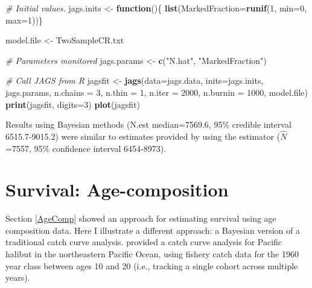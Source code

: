 \documentclass[
]{krantz}
\makeatletter
\newenvironment{Shaded}{\begin{snugshade}}{\end{snugshade}}
\newcommand{\AttributeTok}[1]{\textcolor[rgb]{0.27,0.27,0.27}{#1}}
\newcommand{\CommentTok}[1]{\textcolor[rgb]{0.37,0.37,0.37}{\textit{#1}}}
\newcommand{\ControlFlowTok}[1]{\textcolor[rgb]{0.27,0.27,0.27}{\textbf{#1}}}
\newcommand{\DecValTok}[1]{\textcolor[rgb]{0.06,0.06,0.06}{#1}}
\newcommand{\FunctionTok}[1]{\textcolor[rgb]{0.27,0.27,0.27}{\textbf{#1}}}
\newcommand{\NormalTok}[1]{#1}
\newcommand{\OtherTok}[1]{\textcolor[rgb]{0.37,0.37,0.37}{#1}}
\newcommand{\StringTok}[1]{\textcolor[rgb]{0.5,0.5,0.5}{#1}}
\newenvironment{kframe}{%
\medskip{}
\setlength{\fboxsep}{.8em}
 \def\at@end@of@kframe{}%
 \ifinner\ifhmode%
  \def\at@end@of@kframe{\end{minipage}}%
  \begin{minipage}{\columnwidth}%
 \fi\fi%
 \def\FrameCommand##1{\hskip\@totalleftmargin \hskip-\fboxsep
 \colorbox{shadecolor}{##1}\hskip-\fboxsep
     \hskip-\linewidth \hskip-\@totalleftmargin \hskip\columnwidth}%
 \MakeFramed {\advance\hsize-\width
   \@totalleftmargin\z@ \linewidth\hsize
   \@setminipage}}%
 {\par\unskip\endMakeFramed%
 \at@end@of@kframe}
\renewenvironment{Shaded}{\begin{kframe}}{\end{kframe}}
\makeatother
\begin{document}
\begin{Shaded}
\begin{Highlighting}[]
\CommentTok{\# Initial values.}
\NormalTok{jags.inits }\OtherTok{\textless{}{-}} \ControlFlowTok{function}\NormalTok{()\{ }\FunctionTok{list}\NormalTok{(}\AttributeTok{MarkedFraction=}\FunctionTok{runif}\NormalTok{(}\DecValTok{1}\NormalTok{, }\AttributeTok{min=}\DecValTok{0}\NormalTok{, }\AttributeTok{max=}\DecValTok{1}\NormalTok{))\}}

\NormalTok{model.file }\OtherTok{\textless{}{-}} \StringTok{\textquotesingle{}TwoSampleCR.txt\textquotesingle{}}

\CommentTok{\# Parameters monitored}
\NormalTok{jags.params }\OtherTok{\textless{}{-}} \FunctionTok{c}\NormalTok{(}\StringTok{"N.hat"}\NormalTok{, }\StringTok{"MarkedFraction"}\NormalTok{)}

\CommentTok{\# Call JAGS from R}
\NormalTok{jagsfit }\OtherTok{\textless{}{-}} \FunctionTok{jags}\NormalTok{(}\AttributeTok{data=}\NormalTok{jags.data, }\AttributeTok{inits=}\NormalTok{jags.inits, jags.params,}
                \AttributeTok{n.chains =} \DecValTok{3}\NormalTok{, }\AttributeTok{n.thin =} \DecValTok{1}\NormalTok{, }\AttributeTok{n.iter =} \DecValTok{2000}\NormalTok{,}
                \AttributeTok{n.burnin =} \DecValTok{1000}\NormalTok{, model.file)}
\FunctionTok{print}\NormalTok{(jagsfit, }\AttributeTok{digits=}\DecValTok{3}\NormalTok{)}
\FunctionTok{plot}\NormalTok{(jagsfit)}
\end{Highlighting}
\end{Shaded}

Results using Bayesian methods (N.est median=7569.6, 95\% credible interval 6515.7-9015.2) were similar to estimates provided by \citet{ogle_2016} using the \citet{chapman1951} estimator (\(\hat{N}\)=7557, 95\% confidence interval 6454-8973).

\hypertarget{AgeCompRealData}{%
\section{Survival: Age-composition}\label{AgeCompRealData}}

Section \ref{AgeComp} showed an approach for estimating survival using age composition data. Here I illustrate a different approach: a Bayesian version of a traditional catch curve analysis. \citet{quinn.deriso_1999} provided a catch curve analysis for Pacific halibut in the northeastern Pacific Ocean, using fishery catch data for the 1960 year class between ages 10 and 20 (i.e., tracking a single cohort across multiple years).
\end{document}
